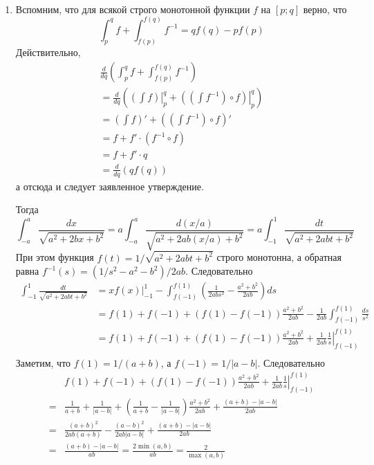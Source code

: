 \documentclass[12pt,a4paper]{article}
\begin{document}
    \begin{enumproblem}\ItemedProblem\ 
        \begin{enumerate}
            \item Вспомним, что для всякой строго монотонной функции $f$ на $[p; q]$ верно, что
                \[\int_p^q f + \int_{f(p)}^{f(q)} f^{-1} = q f(q) - p f(p)\]
                Действительно,
                \begin{multline*}
                    \frac{d}{dq}\left(\int_p^q f + \int_{f(p)}^{f(q)} f^{-1}\right)\\
                    = \frac{d}{dq}\left(\left.\left(\int f\right)\right|_p^q + \left.\left(\left(\int f^{-1}\right) \circ f\right)\right|_p^q\right)\\
                    = \left(\int f\right)' + \left(\left(\int f^{-1}\right) \circ f\right)'\\
                    = f + f' \cdot (f^{-1} \circ f)\\
                    = f + f' \cdot q\\
                    = \frac{d}{dq} (q f(q))
                \end{multline*}
                а отсюда и следует заявленное утверждение.

                Тогда
                \[
                    \int_{-a}^{a} \frac{dx}{\sqrt{a^2 + 2bx + b^2}}
                    = a \int_{-a}^{a} \frac{d(x/a)}{\sqrt{a^2 + 2ab(x/a) + b^2}}
                    = a \int_{-1}^{1} \frac{dt}{\sqrt{a^2 + 2abt + b^2}}
                \]
                При этом функция $f(t) = 1/\sqrt{a^2 + 2abt + b^2}$ строго монотонна, а обратная равна $f^{-1}(s) = (1/s^2 - a^2 - b^2) / 2ab$.
                Следовательно
                \begin{align*}
                    \int_{-1}^{1} \frac{dt}{\sqrt{a^2 + 2abt + b^2}}
                    &= \left. x f(x) \right|_{-1}^{1} - \int_{f(-1)}^{f(1)} \left(\frac{1}{2ab s^2} - \frac{a^2 + b^2}{2ab}\right)ds\\
                    &= f(1) + f(-1) + (f(1) - f(-1))\frac{a^2 + b^2}{2ab} - \frac{1}{2ab} \int_{f(-1)}^{f(1)} \frac{ds}{s^2}\\
                    &= f(1) + f(-1) + (f(1) - f(-1))\frac{a^2 + b^2}{2ab} + \left.\frac{1}{2ab} \frac{1}{s} \right|_{f(-1)}^{f(1)}\\
                \end{align*}
                Заметим, что $f(1) = 1/(a+b)$, а $f(-1) = 1/|a-b|$. Следовательно
                \begin{align*}
                    &f(1) + f(-1) + (f(1) - f(-1))\frac{a^2 + b^2}{2ab} + \left.\frac{1}{2ab} \frac{1}{s} \right|_{f(-1)}^{f(1)}\\
                    = &\frac{1}{a+b} + \frac{1}{|a-b|} + \left(\frac{1}{a+b} - \frac{1}{|a-b|}\right) \frac{a^2 + b^2}{2ab} + \frac{(a+b) - |a-b|}{2ab}\\
                    = &\frac{(a+b)^2}{2ab(a+b)} - \frac{(a-b)^2}{2ab|a-b|} + \frac{(a+b) - |a-b|}{2ab}\\
                    = &\frac{(a+b) - |a-b|}{ab} = \frac{2\min(a, b)}{ab} = \frac{2}{\max(a, b)}
                \end{align*}


\end{enumerate}
\end{enumproblem}
\end{document}
